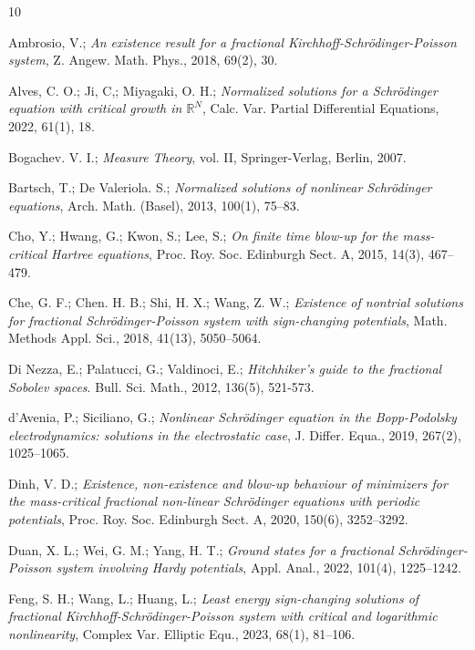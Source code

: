 \begin{thebibliography}{10}

  Ambrosio,  V.;
\emph{An existence result for a fractional Kirchhoff-Schr\"odinger-Poisson system},
 Z. Angew. Math. Phys., 2018, 69(2),  30.

 Alves, C. O.; Ji, C,; Miyagaki, O. H.;
\emph{Normalized solutions for a Schr\"odinger  equation with critical growth in 
$\mathbb{R}^N$}, Calc. Var. Partial Differential Equations, 2022,   61(1), 18.

   Bogachev. V. I.;
\emph{Measure Theory}, vol. II, Springer-Verlag, Berlin, 2007.

 Bartsch, T.; De Valeriola. S.;
\emph{Normalized solutions of nonlinear Schr\"odinger equations},
 Arch. Math. (Basel), 2013,  100(1), 75--83.

   Cho, Y.;  Hwang,  G.;  Kwon, S.;  Lee, S.;
\emph{On finite time blow-up for the mass-critical Hartree equations},
Proc. Roy. Soc. Edinburgh Sect. A,  2015,  14(3), 467--479.

 Che, G. F.; Chen. H. B.; Shi, H. X.; Wang, Z. W.;
\emph{Existence of nontrial solutions for fractional Schr\"odinger-Poisson 
system with sign-changing  potentials}, 
Math. Methods Appl. Sci., 2018, 41(13), 5050--5064.

  Di Nezza, E.; Palatucci, G.; Valdinoci, E.;
\emph{Hitchhiker's guide to the fractional Sobolev spaces}. 
Bull. Sci. Math., 2012, 136(5), 521-573.

 d'Avenia, P.;  Siciliano, G.;
\emph{Nonlinear Schr\"odinger equation in the Bopp-Podolsky electrodynamics: 
solutions in the electrostatic case}, J. Differ. Equa.,  2019,  267(2), 1025--1065.

 Dinh, V. D.;
\emph{Existence, non-existence and blow-up behaviour of minimizers for the 
mass-critical fractional non-linear Schr\"odinger equations with periodic potentials},
Proc. Roy. Soc. Edinburgh Sect. A,  2020,  150(6), 3252--3292.

  Duan, X. L.; Wei, G. M.; Yang, H. T.;
\emph{Ground states for a fractional Schr\"odinger-Poisson system involving 
Hardy potentials}, Appl. Anal., 2022, 101(4), 1225--1242.

  Feng, S. H.; Wang, L.; Huang, L.;
\emph{Least energy sign-changing solutions of fractional Kirchhoff-Schr\"odinger-Poisson 
system with critical and logarithmic nonlinearity}, 
Complex Var. Elliptic Equ., 2023,  68(1), 81--106.


\end{thebibliography}
